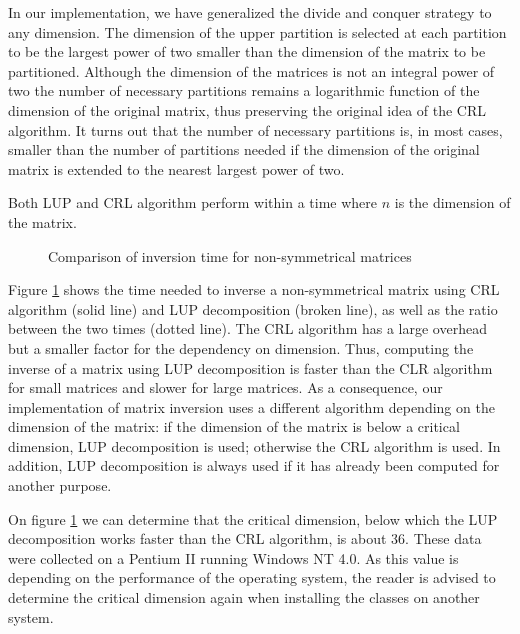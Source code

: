 \documentclass[twoside]{book}
\begin{document}
 In our implementation, we have
generalized the divide and conquer strategy to any dimension. The
dimension of the upper partition is selected at each partition to
be the largest power of two smaller than the dimension of the
matrix to be partitioned. Although the dimension of the matrices
is not an integral power of two the number of necessary partitions
remains a logarithmic function of the dimension of the original
matrix, thus preserving the original idea of the CRL algorithm. It
turns out that the number of necessary partitions is, in most
cases, smaller than the number of partitions needed if the
dimension of the original matrix is extended to the nearest
largest power of two.

Both LUP and CRL algorithm perform within a time  where
$n$ is the dimension of the matrix.
\begin{figure}
\center{}
\caption{Comparison of inversion time for non-symmetrical
matrices}\label{fig:inversionTime}
\end{figure}
Figure \ref{fig:inversionTime} shows the time needed to inverse a
non-symmetrical matrix using CRL algorithm (solid line) and LUP
decomposition (broken line), as well as the ratio between the two
times (dotted line). The CRL algorithm has a large overhead but a
smaller factor for the dependency on dimension. Thus, computing
the inverse of a matrix using LUP decomposition is faster than the
CLR algorithm for small matrices and slower for large matrices. As
a consequence, our implementation of matrix inversion uses a
different algorithm depending on the dimension of the matrix: if
the dimension of the matrix is below a critical dimension, LUP
decomposition is used; otherwise the CRL algorithm is used. In
addition, LUP decomposition is always used if it has already been
computed for another purpose.

On figure \ref{fig:inversionTime} we can determine that the
critical dimension, below which the LUP decomposition works faster
than the CRL algorithm, is about 36. These data were collected on
a Pentium II running Windows NT 4.0. As this value is depending on
the performance of the operating system, the reader is advised to
determine the critical dimension again when installing the classes
on another system.
\end{document}
